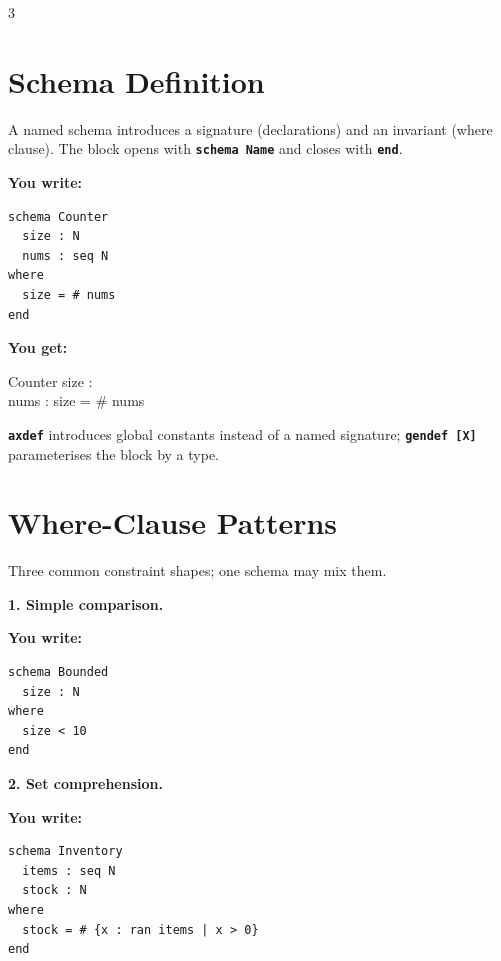 \documentclass[10pt,landscape,a4paper]{article}
\newcommand{\kw}[1]{\texttt{\bfseries #1}}
\newenvironment{exwrite}%
  {\par\noindent\scriptsize\textbf{You write:}\par\vspace{0pt}\scriptsize}%
  {\vspace{1pt}}
\newenvironment{exget}%
  {\par\noindent\scriptsize\textbf{You get:}\par\vspace{0pt}\small}%
  {\par\vspace{3pt}}
\begin{document}
\begin{multicols}{3}
\raggedcolumns

\section{Schema Definition}

{\scriptsize A named schema introduces a signature (declarations) and an invariant (where clause). The block opens with \kw{schema Name} and closes with \kw{end}.}

\begin{exwrite}%
\begin{verbatim}
schema Counter
  size : N
  nums : seq N
where
  size = # nums
end
\end{verbatim}
\end{exwrite}
\begin{exget}%
\begin{schema}{Counter}
size : \nat \\
nums : \seq \nat
\where
size = \# nums
\end{schema}
\end{exget}

{\scriptsize \kw{axdef} introduces global constants instead of a named signature; \kw{gendef [X]} parameterises the block by a type.}

\section{Where-Clause Patterns}

{\scriptsize Three common constraint shapes; one schema may mix them.}

\smallskip
\textbf{1. Simple comparison.}

\begin{exwrite}%
\begin{verbatim}
schema Bounded
  size : N
where
  size < 10
end
\end{verbatim}
\end{exwrite}

\smallskip
\textbf{2. Set comprehension.}

\begin{exwrite}%
\begin{verbatim}
schema Inventory
  items : seq N
  stock : N
where
  stock = # {x : ran items | x > 0}
end
\end{verbatim}
\end{exwrite}


\end{multicols}
\end{document}
